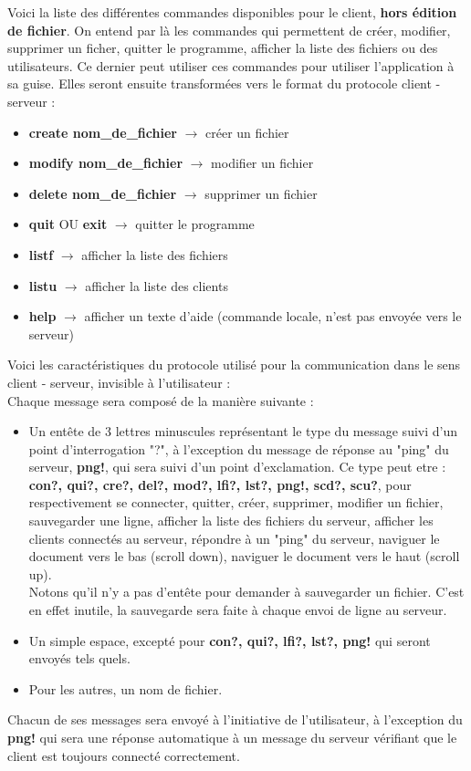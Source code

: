 \documentclass[12pt]{article}
\begin{document}
Voici la liste des différentes commandes disponibles pour le client, \textbf{hors édition de fichier}. On entend par là les commandes qui permettent de créer, modifier, supprimer un ficher, quitter le programme, afficher la liste des fichiers ou des utilisateurs. Ce dernier peut utiliser ces commandes pour utiliser l'application à sa guise. Elles seront ensuite transformées vers le format du protocole client - serveur :\\
\begin{itemize}
\item \textbf{create nom\_de\_fichier} $\rightarrow$ créer un fichier
\item \textbf{modify nom\_de\_fichier} $\rightarrow$ modifier un fichier
\item \textbf{delete nom\_de\_fichier} $\rightarrow$ supprimer un fichier
\item \textbf{quit} OU \textbf{exit} $\rightarrow$ quitter le programme
\item \textbf{listf} $\rightarrow$ afficher la liste des fichiers
\item \textbf{listu} $\rightarrow$ afficher la liste des clients
\item \textbf{help} $\rightarrow$ afficher un texte d'aide (commande locale, n'est pas envoyée vers le serveur)\\
\end{itemize}

Voici les caractéristiques du protocole utilisé pour la communication dans le sens client - serveur, invisible à l'utilisateur :\\

Chaque message sera composé de la manière suivante :
\begin{itemize}
\item Un entête de 3 lettres minuscules représentant le type du message suivi d'un point d'interrogation "?", à l'exception du message de réponse au "ping" du serveur, \textbf{png!}, qui sera suivi d'un point d'exclamation. Ce type peut etre : \textbf{con?, qui?, cre?, del?, mod?, lfi?, lst?, png!, scd?, scu?}, pour respectivement se connecter, quitter, créer, supprimer, modifier un fichier, sauvegarder une ligne, afficher la liste des fichiers du serveur, afficher les clients connectés au serveur, répondre à un "ping" du serveur, naviguer le document vers le bas (scroll down), naviguer le document vers le haut (scroll up).\\
Notons qu'il n'y a pas d'entête pour demander à sauvegarder un fichier. C'est en effet inutile, la sauvegarde sera faite à chaque envoi de ligne au serveur.
\item Un simple espace, excepté pour \textbf{con?, qui?, lfi?, lst?, png!} qui seront envoyés tels quels.
\item Pour les autres, un nom de fichier.\\
\end{itemize}
Chacun de ses messages sera envoyé à l'initiative de l'utilisateur, à l'exception du \textbf{png!} qui sera une réponse automatique à un message du serveur vérifiant que le client est toujours connecté correctement.\\
\end{document}
